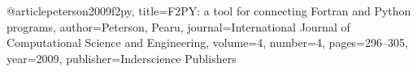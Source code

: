 @article{peterson2009f2py, 
 title={F2PY: a tool for connecting Fortran and Python programs}, 
 author={Peterson, Pearu}, 
 journal={International Journal of Computational Science and Engineering}, 
 volume={4}, 
 number={4}, 
 pages={296--305}, 
 year={2009}, 
 publisher={Inderscience Publishers}}

